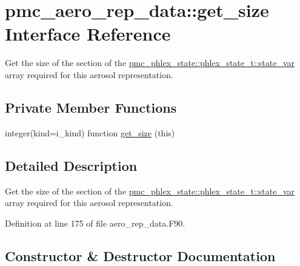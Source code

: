 \hypertarget{interfacepmc__aero__rep__data_1_1get__size}{}\section{pmc\+\_\+aero\+\_\+rep\+\_\+data\+:\+:get\+\_\+size Interface Reference}
\label{interfacepmc__aero__rep__data_1_1get__size}


Get the size of the section of the {\ttfamily \mbox{\hyperlink{structpmc__phlex__state_1_1phlex__state__t_a78835cb552d483ebbfc7a6bc6f756918}{pmc\+\_\+phlex\+\_\+state\+::phlex\+\_\+state\+\_\+t\+::state\+\_\+var}}} array required for this aerosol representation.  


\subsection*{Private Member Functions}
\begin{DoxyCompactItemize}
\item 
integer(kind=i\+\_\+kind) function \mbox{\hyperlink{interfacepmc__aero__rep__data_1_1get__size_a12825879896762c64f697966de364a25}{get\+\_\+size}} (this)
\end{DoxyCompactItemize}


\subsection{Detailed Description}
Get the size of the section of the {\ttfamily \mbox{\hyperlink{structpmc__phlex__state_1_1phlex__state__t_a78835cb552d483ebbfc7a6bc6f756918}{pmc\+\_\+phlex\+\_\+state\+::phlex\+\_\+state\+\_\+t\+::state\+\_\+var}}} array required for this aerosol representation. 

Definition at line 175 of file aero\+\_\+rep\+\_\+data.\+F90.



\subsection{Constructor \& Destructor Documentation}
\mbox{\label{interfacepmc__aero__rep__data_1_1get__size_a12825879896762c64f697966de364a25}} 
